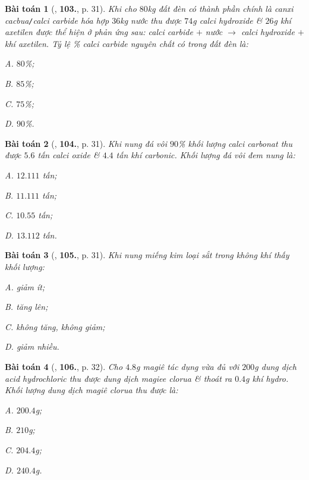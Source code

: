 \documentclass{article}
\numberwithin{equation}{section}
\newtheorem{baitoan}{Bài toán}[section]
\begin{document}
\begin{baitoan}[\cite{An2011}, \textbf{103.}, p. 31]
	Khi cho $80$kg đất đèn có thành phần chính là canxi cacbua\emph{\texttt{/}}calci carbide hóa hợp $36$kg nước thu được $74$g calci hydroxide \& $26$g khí axetilen được  thể hiện ở phản ứng sau: calci carbide $+$ nước $\to$ calci hydroxide $+$ khí axetilen. Tỷ lệ \% calci carbide nguyên chất có trong đất đèn là:
	\begin{enumerate*}
		\item[{\rm\sf A.}] $80$\%;
		\item[{\rm\sf B.}] $85$\%;
		\item[{\rm\sf C.}] $75$\%;
		\item[{\rm\sf D.}] $90$\%.
	\end{enumerate*}
\end{baitoan}

\begin{baitoan}[\cite{An2011}, \textbf{104.}, p. 31]
	Khi nung đá vôi $90$\% khối lượng calci carbonat  thu được $5.6$ tấn calci oxide  \& $4.4$ tấn khí carbonic. Khối lượng đá vôi đem nung là:
	\begin{enumerate*}
		\item[{\rm\sf A.}] $12.111$ tấn;
		\item[{\rm\sf B.}] $11.111$ tấn;
		\item[{\rm\sf C.}] $10.55$ tấn;
		\item[{\rm\sf D.}] $13.112$ tấn.
	\end{enumerate*}
\end{baitoan}

\begin{baitoan}[\cite{An2011}, \textbf{105.}, p. 31]
	Khi nung miếng kim loại sắt trong không khí thấy khối lượng:
	\begin{enumerate*}
		\item[{\rm\sf A.}] giảm ít;
		\item[{\rm\sf B.}] tăng lên;
		\item[{\rm\sf C.}] không tăng, không giảm;
		\item[{\rm\sf D.}] giảm nhiều.
	\end{enumerate*}
\end{baitoan}

\begin{baitoan}[\cite{An2011}, \textbf{106.}, p. 32]
	Cho $4.8$g magiê tác dụng vừa đủ với $200$g dung dịch acid hydrochloric thu được dung dịch magiee clorua \& thoát ra $0.4$g khí hydro. Khối lượng dung dịch magiê clorua thu được là:
	\begin{enumerate*}
		\item[{\rm\sf A.}] $200.4$g;
		\item[{\rm\sf B.}] $210$g;
		\item[{\rm\sf C.}] $204.4$g;
		\item[{\rm\sf D.}] $240.4$g.
	\end{enumerate*}
\end{baitoan}
\end{document}

